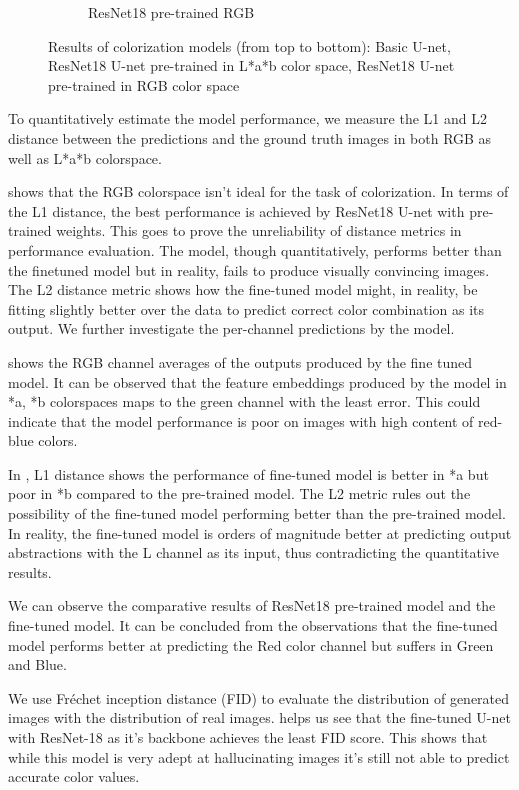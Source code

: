 \documentclass[10pt,twocolumn,letterpaper]{article}
\begin{document}
\begin{figure}[!htb]
\begin{subfigure}[t]{0.3\textwidth}
    		\caption{ResNet18 pre-trained RGB}
    		\label{fig: resnet18_rgb}
    	\end{subfigure}
    	\caption{Results of colorization models (from top to bottom): Basic U-net, ResNet18 U-net pre-trained in L*a*b color space, ResNet18 U-net pre-trained in RGB color space}
    	\label{fig: comparisons}
    \end{figure}
    To quantitatively estimate the model performance, we measure the L1 and L2 distance between the predictions and the ground truth images in both RGB as well as L*a*b colorspace. 
    
     shows that the RGB colorspace isn't ideal for the task of colorization. In terms of the L1 distance, the best performance is achieved by ResNet18 U-net with pre-trained weights. This goes to prove the unreliability of distance metrics in performance evaluation. The model, though quantitatively, performs better than the finetuned model but in reality, fails to produce visually convincing images. The L2 distance metric shows how the fine-tuned model might, in reality, be fitting slightly better over the data to predict correct color combination as its output. We further investigate the per-channel predictions by the model.
    
     shows the RGB channel averages of the outputs produced by the fine tuned model. It can be observed that the feature embeddings produced by the model in *a, *b colorspaces maps to the green channel with the least error. This could indicate that the model performance is poor on images with high content of red-blue colors. 
     
In , L1 distance shows the performance of fine-tuned model is better in *a but poor in *b compared to the pre-trained model. The L2 metric rules out the possibility of the fine-tuned model performing better than the pre-trained model. In reality, the fine-tuned model is orders of magnitude better at predicting output abstractions with the L channel as its input, thus contradicting the quantitative results.
    
    We can observe the comparative results of ResNet18 pre-trained model and the fine-tuned model. It can be concluded from the observations that the fine-tuned model performs better at predicting the Red color channel but suffers in Green and Blue.
    
    We use Fréchet inception distance (FID) to evaluate the distribution of generated images with the distribution of real images.  helps us see that the fine-tuned U-net with ResNet-18 as it's backbone achieves the least FID score. This shows that while this model is very adept at hallucinating images it's still not able to predict accurate color values. 
\end{document}
